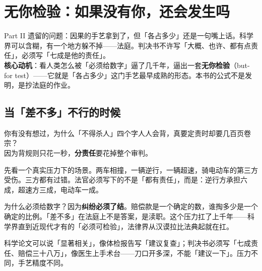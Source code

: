 \documentclass[../../main2.tex]{subfiles}
\begin{document}
\chapter{无你检验：如果没有你，还会发生吗}
\label{ch:butfor}

\begin{motivation}
	Part II 遗留的问题：因果的手艺拿到了，但「各占多少」还是一句嘴上话。科学界可以含糊，有一个地方躲不掉——法庭。判决书不许写「大概、也许、都有点责任」，必须写「七成是他的责任」。\\
	\textbf{核心动机}：看人类怎么被「必须给数字」逼了几千年，逼出一套\textbf{无你检验}（but-for test）——它就是「各占多少」这门手艺最早成熟的形态。本书的公式不是发明，是抄法庭的作业。
\end{motivation}

\begin{logicmap}
\end{logicmap}

\section{当「差不多」不行的时候}

\begin{readingnote}
	你有没有想过，为什么「不得杀人」四个字人人会背，真要定责时却要几百页卷宗？\\
	因为背规则只花一秒，\textbf{分责任}要花掉整个审判。
\end{readingnote}

先看一个真实压力下的场景。两车相撞，一辆逆行，一辆超速，骑电动车的第三方受伤。三方都有过错。法官必须写下的不是「都有责任」，而是：逆行方承担六成，超速方三成，电动车一成。

为什么必须给数字？因为\textbf{纠纷必须了结}。赔偿款是一个确定的数，谁掏多少是一个确定的比例。「差不多」在法庭上不是答案，是渎职。这个压力扛了上千年——科学界直到近现代才有的「必须可检验」，法律界从汉谟拉比法典起就在扛。

\begin{tcolorbox}[colback=green!5, title=\textit{生活类比}]
	科学论文可以说「显著相关」，像体检报告写「建议复查」；判决书必须写「七成责任、赔偿三十八万」，像医生上手术台——刀口开多深，不能「建议一下」。压力不同，手艺精度不同。
\end{tcolorbox}
\end{document}
